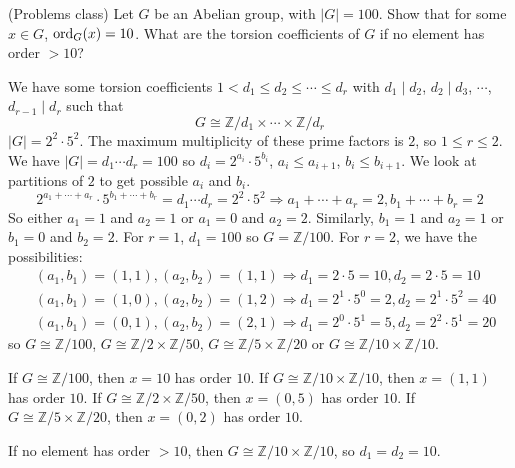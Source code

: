 \begin{example}
	(Problems class) Let $G$ be an Abelian group, with $|G| = 100$. Show that for some $x \in G$, $\text{ord}_G(x) = 10$. What are the torsion coefficients of $G$ if no element has order $> 10$?

	We have some torsion coefficients $1 < d_1 \le d_2 \le \cdots \le d_r$ with $d_1 \mid d_2$, $d_2 \mid d_3$, $\cdots$, $d_{r - 1} \mid d_r$ such that
	\[
		G \cong \mathbb{Z} / d_1 \times \cdots \times \mathbb{Z} / d_r
	\]
	$|G| = 2^2 \cdot 5^2$. The maximum multiplicity of these prime factors is $2$, so $1 \le r \le 2$. We have $|G| = d_1 \cdots d_r = 100$ so $d_i = 2^{a_i} \cdot 5^{b_i}$, $a_i \le a_{i + 1}$, $b_i \le b_{i + 1}$. We look at partitions of $2$ to get possible $a_i$ and $b_i$.
	\[
		2^{a_1 + \cdots + a_r} \cdot 5^{b_1 + \cdots + b_r} = d_1 \cdots d_r = 2^2 \cdot 5^2 \Longrightarrow a_1 + \cdots + a_r = 2, b_1 + \cdots + b_r = 2
	\]
	So either $a_1 = 1$ and $a_2 = 1$ or $a_1 = 0$ and $a_2 = 2$. Similarly, $b_1 = 1$ and $a_2 = 1$ or $b_1 = 0$ and $b_2 = 2$. For $r = 1$, $d_1 = 100$ so $G = \mathbb{Z} / 100$. For $r = 2$, we have the possibilities:
	\[
		\begin{aligned}
			& (a_1, b_1) = (1, 1), (a_2, b_2) = (1, 1) \Longrightarrow d_1 = 2 \cdot 5 = 10, d_2 = 2 \cdot 5 = 10 \\
			& (a_1, b_1) = (1, 0), (a_2, b_2) = (1, 2) \Longrightarrow d_1 = 2^1 \cdot 5^0 = 2, d_2 = 2^1 \cdot 5^2 = 40 \\
			& (a_1, b_1) = (0, 1), (a_2, b_2) = (2, 1) \Longrightarrow d_1 = 2^0 \cdot 5^1 = 5, d_2 = 2^2 \cdot 5^1 = 20
		\end{aligned}
	\]
	so $G \cong \mathbb{Z} / 100$, $G \cong \mathbb{Z} / 2 \times \mathbb{Z} / 50$, $G \cong \mathbb{Z} / 5 \times \mathbb{Z} / 20$ or $G \cong \mathbb{Z} / 10 \times \mathbb{Z} / 10$.

	If $G \cong \mathbb{Z} / 100$, then $x = 10$ has order $10$. If $G \cong \mathbb{Z} / 10 \times \mathbb{Z} / 10$, then $x = (1, 1)$ has order $10$. If $G \cong \mathbb{Z} / 2 \times \mathbb{Z} / 50$, then $x = (0, 5)$ has order $10$. If $G \cong \mathbb{Z} / 5 \times \mathbb{Z} / 20$, then $x = (0, 2)$ has order $10$.

	If no element has order $> 10$, then $G \cong \mathbb{Z} / 10 \times \mathbb{Z} / 10$, so $d_1 = d_2 = 10$.
\end{example}

